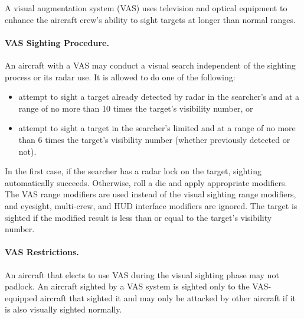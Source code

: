 \begin{advancedrules}
{A visual augmentation system (VAS) uses television and optical equipment to enhance the aircraft crew’s ability to sight targets at longer than normal ranges.


\paragraph{VAS Sighting Procedure.} An aircraft with a VAS may conduct a visual search independent of the sighting process or its radar use. It is allowed to do one of the following:

\begin{itemize}

    \item attempt to sight a target already detected by radar in the searcher’s   and at a range of no more than 10 times the target’s visibility number, or

    \item attempt to sight a target in the searcher’s limited  and at a range of no more than 6 times the target’s visibility number (whether previously detected or not).

\end{itemize}

In the first case, if the searcher has a radar lock on the target, sighting automatically succeeds. Otherwise, roll a die and apply appropriate modifiers. The VAS range modifiers are used instead of the visual sighting range modifiers, and eyesight, multi-crew, and HUD interface modifiers are ignored. The target is sighted if the modified result is less than or equal to the target’s visibility number.


\paragraph{VAS Restrictions.}
An aircraft that elects to use VAS during the visual sighting phase may not padlock. An aircraft sighted by a VAS system is sighted only to the VAS-equipped aircraft that sighted it and may only be attacked by other aircraft if it is also visually sighted normally.

}
\end{advancedrules}
